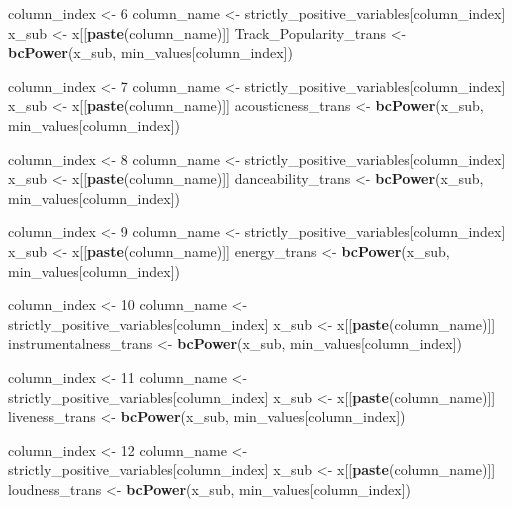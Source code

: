 \documentclass[
]{article}
\newenvironment{Shaded}{\begin{snugshade}}{\end{snugshade}}
\newcommand{\DecValTok}[1]{\textcolor[rgb]{0.00,0.00,0.81}{#1}}
\newcommand{\KeywordTok}[1]{\textcolor[rgb]{0.13,0.29,0.53}{\textbf{#1}}}
\newcommand{\NormalTok}[1]{#1}
\newcommand{\StringTok}[1]{\textcolor[rgb]{0.31,0.60,0.02}{#1}}
\begin{document}
\begin{Shaded}
\begin{Highlighting}[]
\NormalTok{column_index <-}\StringTok{ }\DecValTok{6}
\NormalTok{column_name <-}\StringTok{ }\NormalTok{strictly_positive_variables[column_index]}
\NormalTok{x_sub <-}\StringTok{ }\NormalTok{x[[}\KeywordTok{paste}\NormalTok{(column_name)]]}
\NormalTok{Track_Popularity_trans <-}\StringTok{ }\KeywordTok{bcPower}\NormalTok{(x_sub, min_values[column_index])}

\NormalTok{column_index <-}\StringTok{ }\DecValTok{7}
\NormalTok{column_name <-}\StringTok{ }\NormalTok{strictly_positive_variables[column_index]}
\NormalTok{x_sub <-}\StringTok{ }\NormalTok{x[[}\KeywordTok{paste}\NormalTok{(column_name)]]}
\NormalTok{acousticness_trans <-}\StringTok{ }\KeywordTok{bcPower}\NormalTok{(x_sub, min_values[column_index])}

\NormalTok{column_index <-}\StringTok{ }\DecValTok{8}
\NormalTok{column_name <-}\StringTok{ }\NormalTok{strictly_positive_variables[column_index]}
\NormalTok{x_sub <-}\StringTok{ }\NormalTok{x[[}\KeywordTok{paste}\NormalTok{(column_name)]]}
\NormalTok{danceability_trans <-}\StringTok{ }\KeywordTok{bcPower}\NormalTok{(x_sub, min_values[column_index])}

\NormalTok{column_index <-}\StringTok{ }\DecValTok{9}
\NormalTok{column_name <-}\StringTok{ }\NormalTok{strictly_positive_variables[column_index]}
\NormalTok{x_sub <-}\StringTok{ }\NormalTok{x[[}\KeywordTok{paste}\NormalTok{(column_name)]]}
\NormalTok{energy_trans <-}\StringTok{ }\KeywordTok{bcPower}\NormalTok{(x_sub, min_values[column_index])}

\NormalTok{column_index <-}\StringTok{ }\DecValTok{10}
\NormalTok{column_name <-}\StringTok{ }\NormalTok{strictly_positive_variables[column_index]}
\NormalTok{x_sub <-}\StringTok{ }\NormalTok{x[[}\KeywordTok{paste}\NormalTok{(column_name)]]}
\NormalTok{instrumentalness_trans <-}\StringTok{ }\KeywordTok{bcPower}\NormalTok{(x_sub, min_values[column_index])}

\NormalTok{column_index <-}\StringTok{ }\DecValTok{11}
\NormalTok{column_name <-}\StringTok{ }\NormalTok{strictly_positive_variables[column_index]}
\NormalTok{x_sub <-}\StringTok{ }\NormalTok{x[[}\KeywordTok{paste}\NormalTok{(column_name)]]}
\NormalTok{liveness_trans <-}\StringTok{ }\KeywordTok{bcPower}\NormalTok{(x_sub, min_values[column_index])}

\NormalTok{column_index <-}\StringTok{ }\DecValTok{12}
\NormalTok{column_name <-}\StringTok{ }\NormalTok{strictly_positive_variables[column_index]}
\NormalTok{x_sub <-}\StringTok{ }\NormalTok{x[[}\KeywordTok{paste}\NormalTok{(column_name)]]}
\NormalTok{loudness_trans <-}\StringTok{ }\KeywordTok{bcPower}\NormalTok{(x_sub, min_values[column_index])}


\end{Highlighting}
\end{Shaded}
\end{document}
